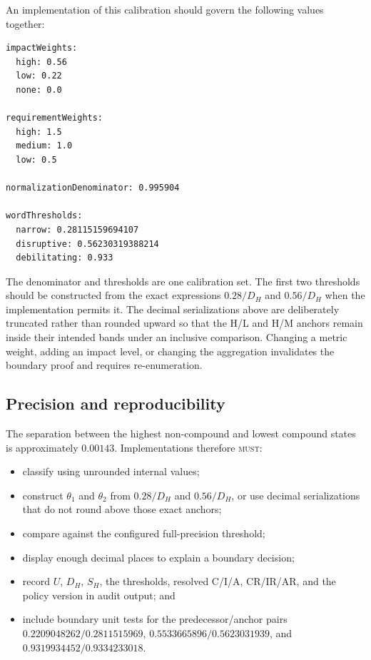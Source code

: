 \documentclass[11pt]{article}
\newcommand{\rfckw}[1]{\textsc{#1}}
\begin{document}
An implementation of this calibration should govern the following values together:

\begin{verbatim}
impactWeights:
  high: 0.56
  low: 0.22
  none: 0.0

requirementWeights:
  high: 1.5
  medium: 1.0
  low: 0.5

normalizationDenominator: 0.995904

wordThresholds:
  narrow: 0.28115159694107
  disruptive: 0.56230319388214
  debilitating: 0.933
\end{verbatim}

The denominator and thresholds are one calibration set. The first two thresholds
should be constructed from the exact expressions $0.28/D_H$ and $0.56/D_H$ when the
implementation permits it. The decimal serializations above are deliberately
truncated rather than rounded upward so that the H/L and H/M anchors remain inside
their intended bands under an inclusive comparison. Changing a metric weight, adding
an impact level, or changing the aggregation invalidates the boundary proof and
requires re-enumeration.

\subsection{Precision and reproducibility}

The separation between the highest non-compound and lowest compound states is
approximately $0.00143$. Implementations therefore \rfckw{must}:

\begin{itemize}[leftmargin=1.5em]
\item classify using unrounded internal values;
\item construct $\theta_1$ and $\theta_2$ from $0.28/D_H$ and $0.56/D_H$, or use
  decimal serializations that do not round above those exact anchors;
\item compare against the configured full-precision threshold;
\item display enough decimal places to explain a boundary decision;
\item record $U$, $D_H$, $S_H$, the thresholds, resolved C/I/A, CR/IR/AR, and the
  policy version in audit output; and
\item include boundary unit tests for the predecessor/anchor pairs
  $0.2209048262/0.2811515969$, $0.5533665896/0.5623031939$, and
  $0.9319934452/0.9334233018$.
\end{itemize}
\end{document}
